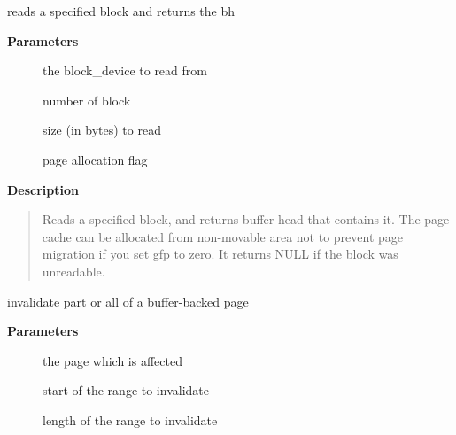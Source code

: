 \documentclass[a4paper,8pt,english]{sphinxmanual}
\begin{document}
\begin{fulllineitems}
\label{filesystems/index:c.__bread_gfp}
reads a specified block and returns the bh

\end{fulllineitems}


\textbf{Parameters}
\begin{description}
\item[{}] \leavevmode
the block\_device to read from

\item[{}] \leavevmode
number of block

\item[{}] \leavevmode
size (in bytes) to read

\item[{}] \leavevmode
page allocation flag

\end{description}

\textbf{Description}
\begin{quote}

Reads a specified block, and returns buffer head that contains it.
The page cache can be allocated from non-movable area
not to prevent page migration if you set gfp to zero.
It returns NULL if the block was unreadable.
\end{quote}

\begin{fulllineitems}
\label{filesystems/index:c.block_invalidatepage}
invalidate part or all of a buffer-backed page

\end{fulllineitems}


\textbf{Parameters}
\begin{description}
\item[{}] \leavevmode
the page which is affected

\item[{}] \leavevmode
start of the range to invalidate

\item[{}] \leavevmode
length of the range to invalidate

\end{description}
\end{document}
